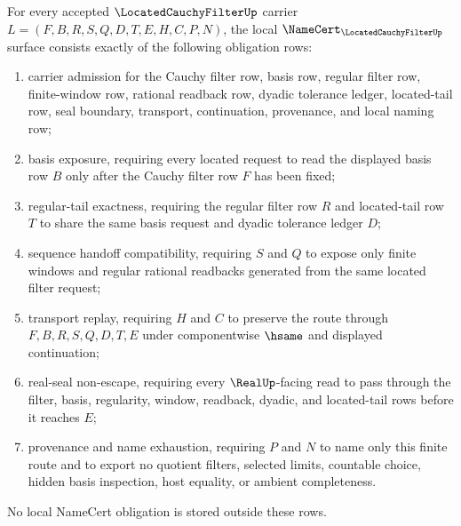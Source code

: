 \begin{theorem}
\label{thm:located-cauchy-filter-namecert-obligations}
For every accepted $\LocatedCauchyFilterUp$ carrier $L=(F,B,R,S,Q,D,T,E,H,C,P,N)$, the local $\NameCert_{\LocatedCauchyFilterUp}$ surface consists exactly of the following obligation rows:
\begin{enumerate}
\item carrier admission for the Cauchy filter row, basis row, regular filter row, finite-window row, rational readback row, dyadic tolerance ledger, located-tail row, seal boundary, transport, continuation, provenance, and local naming row;
\item basis exposure, requiring every located request to read the displayed basis row $B$ only after the Cauchy filter row $F$ has been fixed;
\item regular-tail exactness, requiring the regular filter row $R$ and located-tail row $T$ to share the same basis request and dyadic tolerance ledger $D$;
\item sequence handoff compatibility, requiring $S$ and $Q$ to expose only finite windows and regular rational readbacks generated from the same located filter request;
\item transport replay, requiring $H$ and $C$ to preserve the route through $F,B,R,S,Q,D,T,E$ under componentwise $\hsame$ and displayed continuation;
\item real-seal non-escape, requiring every $\RealUp$-facing read to pass through the filter, basis, regularity, window, readback, dyadic, and located-tail rows before it reaches $E$;
\item provenance and name exhaustion, requiring $P$ and $N$ to name only this finite route and to export no quotient filters, selected limits, countable choice, hidden basis inspection, host equality, or ambient completeness.
\end{enumerate}
No local NameCert obligation is stored outside these rows.
\end{theorem}
